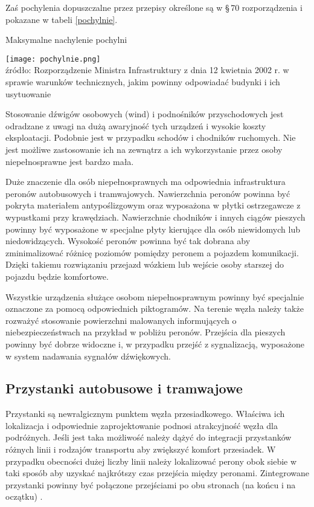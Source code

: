 \documentclass[twoside,12pt]{article}
\begin{document}
	 Zaś pochylenia dopuszczalne przez przepisy określone są w §\,70 rozporządzenia i pokazane w tabeli \ref{pochylnie}.
	 	\begin{table}[H]
		\centering
		\caption{Maksymalne nachylenie pochylni}
		\texttt{[image: pochylnie.png]}\\
		\footnotesize{źródło: Rozporządzenie Ministra Infrastruktury z dnia 12 kwietnia 2002 r.	w sprawie warunków technicznych, jakim powinny odpowiadać budynki i ich usytuowanie \cite{warunki_techniczne}}
		\label{pochylnie}
	\end{table}
	
	Stosowanie dźwigów osobowych (wind) i podnośników przyschodowych jest odradzane z uwagi na dużą awaryjność tych urządzeń i wysokie koszty eksploatacji. Podobnie jest w przypadku schodów i chodników ruchomych. Nie jest możliwe zastosowanie ich na zewnątrz a ich wykorzystanie przez osoby niepełnosprawne jest bardzo mała. 
	
	Duże znaczenie dla osób niepełnosprawnych ma odpowiednia infrastruktura peronów autobusowych i tramwajowych. Nawierzchnia peronów powinna być pokryta materiałem antypoślizgowym oraz wyposażona w płytki ostrzegawcze z wypustkami przy krawędziach. Nawierzchnie chodników i innych ciągów pieszych powinny być wyposażone w specjalne płyty kierujące dla osób niewidomych lub niedowidzących. Wysokość peronów powinna być tak dobrana aby zminimalizować różnicę poziomów pomiędzy peronem a pojazdem komunikacji. Dzięki takiemu rozwiązaniu przejazd wózkiem lub wejście osoby starszej do pojazdu będzie komfortowe.
	
	Wszystkie urządzenia służące osobom niepełnosprawnym powinny być specjalnie oznaczone za pomocą odpowiednich piktogramów. Na terenie węzła należy także rozważyć stosowanie powierzchni malowanych informujących o niebezpieczeństwach na przykład w pobliżu peronów. Przejścia dla pieszych powinny być dobrze widoczne i, w przypadku przejść z sygnalizacją, wyposażone w system nadawania sygnałów dźwiękowych. 
	 
	\clearpage
	\subsection{Przystanki autobusowe i tramwajowe}

	Przystanki są newralgicznym punktem węzła przesiadkowego. Właściwa ich lokalizacja i odpowiednie zaprojektowanie podnosi atrakcyjność węzła dla podróżnych. Jeśli jest taka możliwość należy dążyć do integracji przystanków różnych linii i rodzajów transportu aby zwiększyć komfort przesiadek. W przypadku obecności dużej liczby linii należy lokalizować perony obok siebie w taki sposób aby uzyskać najkrótszy czas przejścia między peronami. Zintegrowane przystanki powinny być połączone przejściami po obu stronach (na końcu i na oczątku) \cite{standardy_wroclaw}. 
	
\end{document}
